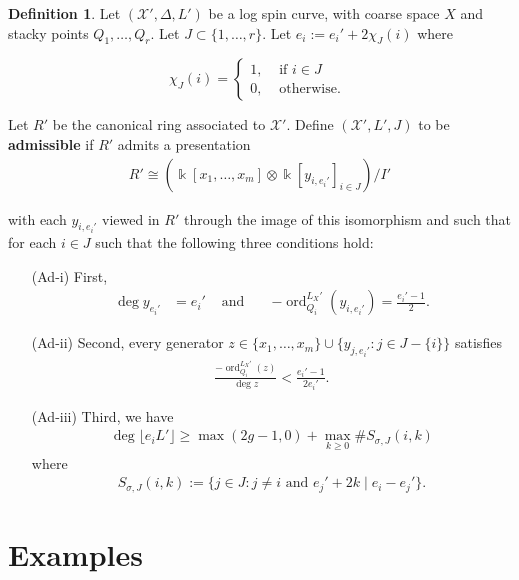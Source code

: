 \documentclass{amsart}
\makeatletter
\theoremstyle{plain}
\theoremstyle{definition}
\newtheorem{defn}[thm]{Definition}
\theoremstyle{remark}
\numberwithin{equation}{section}
\newcommand\Bk{{\Bbbk}}
\DeclareMathOperator{\ord}{ord}
\newcommand\sx{\mathscr X}
\newcommand \subhalf[1]{\frac{{#1} - 1}{2{#1}}}
\newcommand{\halfcan}{L}
\newcommand{\customlabel}[2]{%
   \protected@write \@auxout {}{\string \newlabel {#1}{{#2}{\thepage}{#2}{#1}{}} }%
   \hypertarget{#1}{#2}
}
\makeatother
\begin{document}
\begin{defn}
\label{defn:admissible}
Let $(\sx', \Delta, L')$ be a log spin
curve, with coarse space $X$ and stacky points $Q_1, \ldots, Q_r$.  Let $J \subset
\{1, \ldots, r\}$. Let $e_i := e_i'+ 2 \chi_J (i)$ where

\[
\chi_J(i) = \begin{cases}
	1, &\text{ if }i \in J\\
	0, &\text{ otherwise. } 
\end{cases}
\]

Let $R'$ be the canonical ring associated to $\sx'$. Define $(\sx', \halfcan', J)$
to be {\bf admissible} if $R'$ admits a presentation
\begin{align*}
	R' \cong \left( \Bk[x_1, \ldots, x_m] \otimes \Bk[y_{i, e_i'}]_{i \in J} \right)/I'
\end{align*}

\noindent
with each $y_{i, e_i'}$ viewed in $R'$ through the image of this isomorphism and such that for each $i \in J$ such that the following
three conditions hold:
\begin{enumerate}
	\item[\customlabel{custom:Ad-i}{(Ad-i)}] First, 
		\begin{align*}
		\deg y_{e_i'} &= e_i'  &\text{ and } &&-\ord_{Q_i}^{\halfcan_X'}(y_{i, e_i'})
			= \frac{e_i'- 1}{2}.
		\end{align*}
	\item[\customlabel{custom:Ad-ii}{(Ad-ii)}] Second, every generator $z 
		\in \{x_1, \ldots, x_m\} \cup \{y_{j, e_i'}: j\in J - \{i\} \}$ 
		satisfies
		\begin{align*}
			\frac{-\ord_{Q_i}^{\halfcan_X'}(z)}{\deg z} < \subhalf {e_i'}.
		\end{align*}
	\item[\customlabel{custom:Ad-iii}{(Ad-iii)}] Third, we have
		\begin{align*}
			\deg \lfloor e_i L' \rfloor \geq \max(2g - 1,0) + \max_{k \geq 0} \# S_{\sigma, J}(i, k)
		\end{align*}
		where
		\begin{align*}
			S_{\sigma, J}(i, k) := \{j \in J : j \neq i \text{ and } e_j'+2k
			\mid e_i - e_j'\}.
		\end{align*}
\end{enumerate}
\end{defn}


\section{Examples}
\label{sec:examples}
\end{document}
